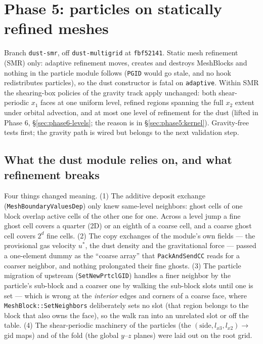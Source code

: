 \documentclass[11pt]{article}
\newcommand{\code}[1]{\texttt{#1}}
\newcommand{\fn}[1]{\texttt{\small #1}}
\begin{document}
\section{Phase 5: particles on statically refined meshes}
\label{sec:phase5}

Branch \code{dust-smr}, off \code{dust-multigrid} at \code{fbf52141}. Static mesh
refinement (SMR) only: adaptive refinement moves, creates and destroys MeshBlocks and
nothing in the particle module follows (\code{PGID} would go stale, and no hook
redistributes particles), so the dust constructor is fatal on \code{adaptive}. Within
SMR the shearing-box policies of the gravity track apply unchanged: both shear-periodic
$x_1$ faces at one uniform level, refined regions spanning the full $x_2$ extent under
orbital advection, and at most one level of refinement for the dust (lifted in Phase 6, \S\ref{sec:phase6-levels}; the reason is in
\S\ref{sec:phase5:kernel}). Gravity-free tests first; the gravity path is wired but
belongs to the next validation step.

\subsection{What the dust module relies on, and what refinement breaks}

Four things changed meaning. (1) The additive deposit exchange
(\code{MeshBoundaryValuesDep}) only knew same-level neighbors: ghost cells of one block
overlap active cells of the other one for one. Across a level jump a fine ghost cell
covers a quarter (2D) or an eighth of a coarse cell, and a coarse ghost cell covers
$2^d$ fine cells. (2) The copy exchanges of the module's own fields --- the provisional
gas velocity $u^*$, the dust density and the gravitational force --- passed a
one-element dummy as the ``coarse array'' that \fn{PackAndSendCC} reads for a coarser
neighbor, and nothing prolongated their fine ghosts. (3) The particle migration of
upstream (\fn{SetNewPrtclGID}) handles a finer neighbor by the particle's sub-block and a
coarser one by walking the sub-block slots until one is set --- which is wrong at the
\emph{interior} edges and corners of a coarse face, where \fn{MeshBlock::SetNeighbors}
deliberately sets no slot (that region belongs to the block that also owns the face),
so the walk ran into an unrelated slot or off the table. (4) The shear-periodic
machinery of the particles (the $(\mathrm{side}, l_{x3}, l_{x2}) \to$ gid maps) and of
the fold (the global $y$--$z$ planes) were laid out on the root grid.
\end{document}

